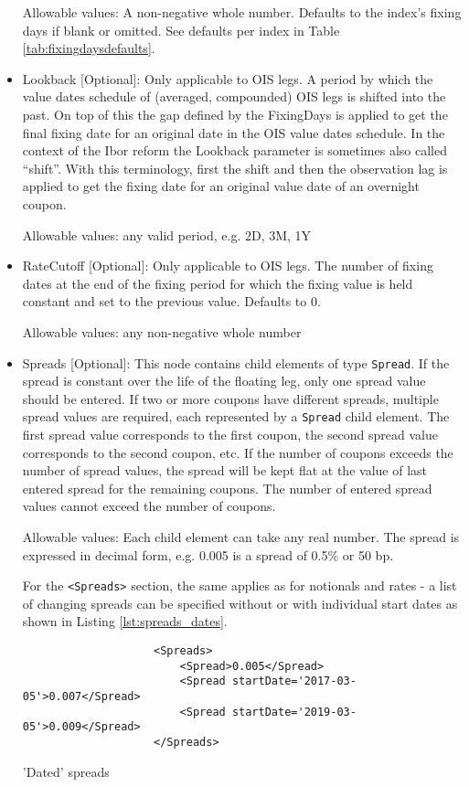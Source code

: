 \begin{itemize}
  Allowable values: A non-negative whole number.  Defaults to the index's fixing days if blank or omitted. See defaults per index in Table \ref{tab:fixingdaysdefaults}.

\item Lookback [Optional]: Only applicable to OIS legs. A period by which the value dates schedule of (averaged,
  compounded) OIS legs is shifted into the past. On top of this the gap defined by the FixingDays is applied to get the
  final fixing date for an original date in the OIS value dates schedule. In the context of the Ibor reform the Lookback
  parameter is sometimes also called ``shift''. With this terminology, first the shift and then the observation lag is
  applied to get the fixing date for an original value date of an overnight coupon.

  Allowable values: any valid period, e.g. 2D, 3M, 1Y

\item RateCutoff [Optional]: Only applicable to OIS legs. The number of fixing dates at the end of the fixing period for
  which the fixing value is held constant and set to the previous value. Defaults to $0$.

Allowable values: any non-negative whole number

\item Spreads [Optional]: This node contains child elements of type
  \lstinline!Spread!. If the spread is constant over the life of the
  floating leg, only one spread value should be entered. If two or more
  coupons have different spreads, multiple spread values are required,
  each represented by a \lstinline!Spread! child element. The first
  spread value corresponds to the first coupon, the second spread
  value corresponds to the second coupon, etc. If the number of
  coupons exceeds the number of spread values, the spread will be kept
  flat at the value of last entered spread for the remaining coupons.
  The number of entered spread values cannot exceed the number of
  coupons. 

  Allowable values: Each child element can take any real number. The spread is expressed in decimal form, e.g. 0.005 is
  a spread of 0.5\% or 50 bp. 

For the {\tt <Spreads>} section, the same applies as for notionals and
rates - a list of changing spreads can be specified without or with individual start dates as shown
in Listing \ref{lst:spreads_dates}.
\begin{listing}[H]
\begin{verbatim}
                    <Spreads>
                        <Spread>0.005</Spread>
                        <Spread startDate='2017-03-05'>0.007</Spread>
                        <Spread startDate='2019-03-05'>0.009</Spread>
                    </Spreads>
\end{verbatim}
\caption{'Dated' spreads}
\label{lst:spreads_dates}
\end{listing}


\end{itemize}
